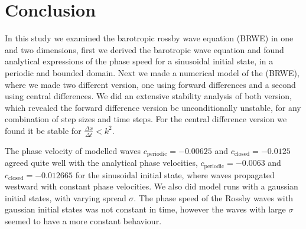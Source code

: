 \section{Conclusion}
In this study we examined the barotropic rossby wave equation (BRWE) in one and
two dimensions, first we derived
the barotropic wave equation and found analytical expressions of the phase
speed for a sinusoidal initial state, in a periodic and bounded domain.
Next we made a numerical model of the (BRWE), where we made two different
version, one using forward differences and a second using central differences.
We did an extensive stability analysis of both version, which revealed the
forward difference version be unconditionally unstable, for any combination of
step sizes and time steps. For the central difference version we found it be
stable for $\frac{\Delta x}{\Delta t} < k^2$. 

The phase velocity of modelled waves $c_{\mathrm{periodic}}= - 0.00625$ and
$c_{\mathrm{closed}} = - 0.0125$ agreed quite well with the analytical phase
velocities, $c_{\mathrm{periodic}} = -0.0063$ and $c_{\mathrm{closed}} =
-0.012665$ for the
sinusoidal initial state, where waves propagated westward with constant
phase velocities. We also did model runs with a gaussian initial states, with
varying spread $\sigma$. The phase speed of the Rossby waves with gaussian
initial states was not constant in time, however the waves with large $\sigma$
seemed to have a more constant behaviour. 